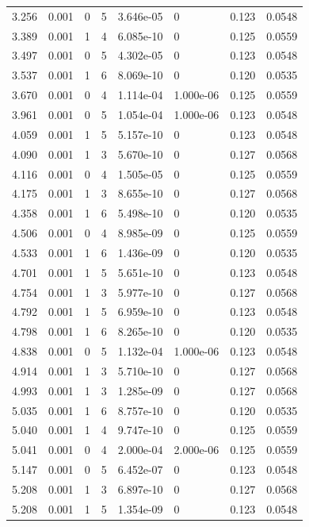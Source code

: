 \documentclass[preview]{standalone}
\begin{document}
{{\begin{tabular}{L{1.2cm}C{1.2cm} C{0.3cm}C{0.5cm} C{1.4cm}C{1.4cm} C{1.4cm}C{1.4cm}}
  3.256  &  0.001  & 0     &  5 &  3.646e-05  & 0  & 0.123 &  0.0548   \\ 
  3.389  &  0.001  & 1     &  4 &  6.085e-10  & 0  & 0.125 &  0.0559   \\ 
  3.497  &  0.001  & 0     &  5 &  4.302e-05  & 0  & 0.123 &  0.0548   \\ 
  3.537  &  0.001  & 1     &  6 &  8.069e-10  & 0  & 0.120 &  0.0535   \\ 
  3.670  &  0.001  & 0     &  4 &  1.114e-04  & 1.000e-06  & 0.125 &  0.0559   \\ 
  3.961  &  0.001  & 0     &  5 &  1.054e-04  & 1.000e-06  & 0.123 &  0.0548   \\ 
  4.059  &  0.001  & 1     &  5 &  5.157e-10  & 0  & 0.123 &  0.0548   \\ 
  4.090  &  0.001  & 1     &  3 &  5.670e-10  & 0  & 0.127 &  0.0568   \\ 
  4.116  &  0.001  & 0     &  4 &  1.505e-05  & 0  & 0.125 &  0.0559   \\ 
  4.175  &  0.001  & 1     &  3 &  8.655e-10  & 0  & 0.127 &  0.0568   \\ 
  4.358  &  0.001  & 1     &  6 &  5.498e-10  & 0  & 0.120 &  0.0535   \\ 
  4.506  &  0.001  & 0     &  4 &  8.985e-09  & 0  & 0.125 &  0.0559   \\ 
  4.533  &  0.001  & 1     &  6 &  1.436e-09  & 0  & 0.120 &  0.0535   \\ 
  4.701  &  0.001  & 1     &  5 &  5.651e-10  & 0  & 0.123 &  0.0548   \\ 
  4.754  &  0.001  & 1     &  3 &  5.977e-10  & 0  & 0.127 &  0.0568   \\ 
  4.792  &  0.001  & 1     &  5 &  6.959e-10  & 0  & 0.123 &  0.0548   \\ 
  4.798  &  0.001  & 1     &  6 &  8.265e-10  & 0  & 0.120 &  0.0535   \\ 
  4.838  &  0.001  & 0     &  5 &  1.132e-04  & 1.000e-06  & 0.123 &  0.0548   \\ 
  4.914  &  0.001  & 1     &  3 &  5.710e-10  & 0  & 0.127 &  0.0568   \\ 
  4.993  &  0.001  & 1     &  3 &  1.285e-09  & 0  & 0.127 &  0.0568   \\ 
  5.035  &  0.001  & 1     &  6 &  8.757e-10  & 0  & 0.120 &  0.0535   \\ 
  5.040  &  0.001  & 1     &  4 &  9.747e-10  & 0  & 0.125 &  0.0559   \\ 
  5.041  &  0.001  & 0     &  4 &  2.000e-04  & 2.000e-06  & 0.125 &  0.0559   \\ 
  5.147  &  0.001  & 0     &  5 &  6.452e-07  & 0  & 0.123 &  0.0548   \\ 
  5.208  &  0.001  & 1     &  3 &  6.897e-10  & 0  & 0.127 &  0.0568   \\ 
  5.208  &  0.001  & 1     &  5 &  1.354e-09  & 0  & 0.123 &  0.0548   \\ 
\hline 
\end{tabular} 

}}
\end{document}
